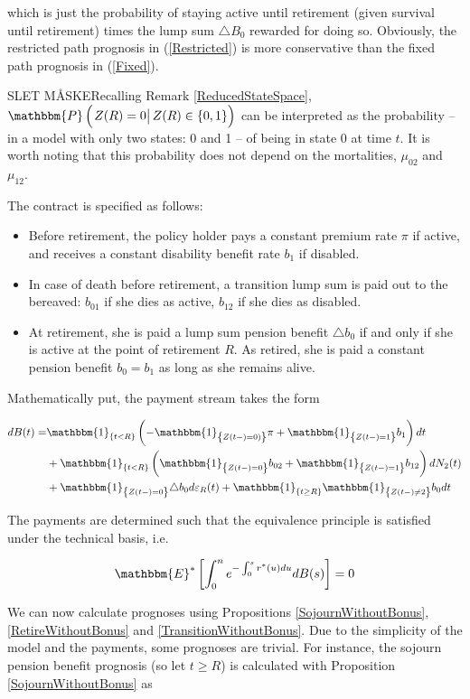 \documentclass{book}
\newcommand{\1}[1]{\mathbbm{1}_{\left\lbrace #1 \right\rbrace}}
\newcommand{\pcond}[2][def]{\mathbbm{P} \left( \left. #1 \right| #2 \right)}
\newcommand{\expecStar}[1][def]{\mathbbm{E}^* \left[ #1 \right]}
\theoremstyle{break}
\theoremstyle{remark}
\numberwithin{equation}{section}
\begin{document}
which is just the probability of staying active until retirement (given survival until retirement) times the lump sum $\triangle B_0$ rewarded for doing so. Obviously, the restricted path prognosis in (\ref{Restricted}) is more conservative than the fixed path prognosis in (\ref{Fixed}).

SLET MÅSKERecalling Remark \ref{ReducedStateSpace}, $\pcond[Z(R) = 0]{Z(R) \in \{ 0,1 \}}$ can be interpreted as the probability -- in a model with only two states: 0 and 1 -- of being in state 0 at time $t$. It is worth noting that this probability does not depend on the mortalities, $\mu_{02}$ and $\mu_{12}$.


The contract is specified as follows:

\begin{itemize}
    \item Before retirement, the policy holder pays a constant premium rate $\pi$ if active, and receives a constant disability benefit rate $b_1$ if disabled.
    \item In case of death before retirement, a transition lump sum is paid out to the bereaved: $b_{01}$ if she dies as active, $b_{12}$ if she dies as disabled.
    \item At retirement, she is paid a lump sum pension benefit $\triangle b_0$ if and only if she is active at the point of retirement $R$. As retired, she is paid a constant pension benefit $b_0=b_1$ as long as she remains alive.
\end{itemize}

Mathematically put, the payment stream takes the form

\begin{align*}
    dB(t) =& \1{t<R} \left( - \1{Z(t-)=0)} \pi + \1{Z(t-)=1} b_1 \right) dt \\
    &+ \1{t<R} \left( \1{Z(t-)=0} b_{02} + \1{Z(t-)=1} b_{12} \right) dN_2(t) \\
    &+ \1{Z(t-)=0} \triangle b_0 d \varepsilon_R(t) + \1{t \geq R} \1{Z(t-) \neq 2} b_0dt
\end{align*}

The payments are determined such that the equivalence principle is satisfied under the technical basis, i.e.

\begin{align*}
    \expecStar[\int_0^n e^{-\int_0^s r^*(u)du} dB(s)] = 0
\end{align*}

We can now calculate prognoses using Propositions \ref{SojournWithoutBonus}, \ref{RetireWithoutBonus} and \ref{TransitionWithoutBonus}. Due to the simplicity of the model and the payments, some prognoses are trivial. For instance, the sojourn pension benefit prognosis (so let $t \geq R$) is calculated with Proposition \ref{SojournWithoutBonus} as
\end{document}
